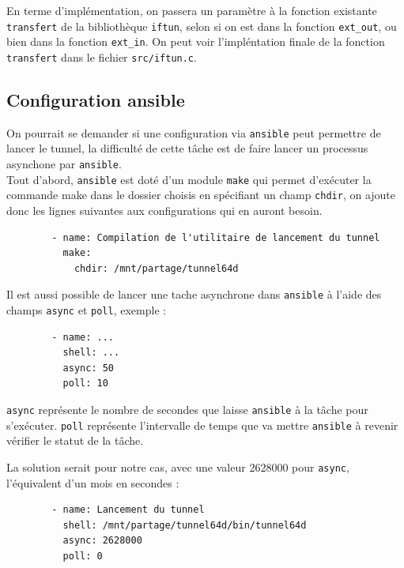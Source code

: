 \documentclass[a4paper, 10pt]{article}
\begin{document}
      En terme d'implémentation, on passera un paramètre à la fonction existante
      \verb+transfert+ de la bibliothèque \verb+iftun+, selon si on est dans la
      fonction \verb+ext_out+, ou bien dans la fonction \verb+ext_in+. On peut
      voir l'impléntation finale de la fonction \verb+transfert+ dans le fichier
      \verb+src/iftun.c+.

    \subsection{Configuration ansible}
      On pourrait se demander si une configuration via \verb+ansible+ peut
      permettre de lancer le tunnel, la difficulté de cette tâche est de faire
      lancer un processus asynchone par \verb+ansible+. \\

      Tout d'abord, \verb+ansible+ est doté d'un module \verb+make+ qui permet
      d'exécuter la commande make dans le dossier choisis en spécifiant un champ
      \verb+chdir+, on ajoute donc les lignes suivantes aux configurations qui
      en auront besoin.

      \begin{verbatim}
        - name: Compilation de l'utilitaire de lancement du tunnel
          make:
            chdir: /mnt/partage/tunnel64d
      \end{verbatim}

      Il est aussi possible de lancer une tache asynchrone dans \verb+ansible+ à
      l'aide des champs \verb+async+ et \verb+poll+, exemple :

      \begin{verbatim}
        - name: ...
          shell: ...
          async: 50
          poll: 10
      \end{verbatim}

      \verb+async+ représente le nombre de secondes que laisse \verb+ansible+ à
      la tâche pour s'exécuter. \verb+poll+ représente l'intervalle de temps que
      va mettre \verb+ansible+ à revenir vérifier le statut de la tâche.

      La solution serait pour notre cas, avec une valeur 2628000 pour
      \verb+async+, l'équivalent d'un mois en secondes :

      \begin{verbatim}
        - name: Lancement du tunnel
          shell: /mnt/partage/tunnel64d/bin/tunnel64d
          async: 2628000
          poll: 0
      \end{verbatim}
\end{document}
